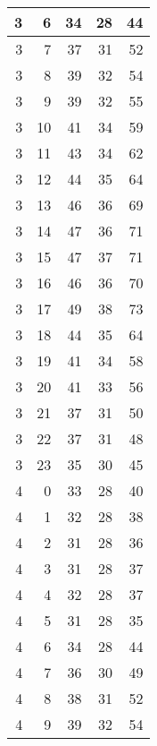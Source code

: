 \begin{longtable}{|r|r|r|r|r|}
    \hline
    3     & 6     & 34    & 28    & 44 \\
    \hline
    3     & 7     & 37    & 31    & 52 \\
    \hline
    3     & 8     & 39    & 32    & 54 \\
    \hline
    3     & 9     & 39    & 32    & 55 \\
    \hline
    3     & 10    & 41    & 34    & 59 \\
    \hline
    3     & 11    & 43    & 34    & 62 \\
    \hline
    3     & 12    & 44    & 35    & 64 \\
    \hline
    3     & 13    & 46    & 36    & 69 \\
    \hline
    3     & 14    & 47    & 36    & 71 \\
    \hline
    3     & 15    & 47    & 37    & 71 \\
    \hline
    3     & 16    & 46    & 36    & 70 \\
    \hline
    3     & 17    & 49    & 38    & 73 \\
    \hline
    3     & 18    & 44    & 35    & 64 \\
    \hline
    3     & 19    & 41    & 34    & 58 \\
    \hline
    3     & 20    & 41    & 33    & 56 \\
    \hline
    3     & 21    & 37    & 31    & 50 \\
    \hline
    3     & 22    & 37    & 31    & 48 \\
    \hline
    3     & 23    & 35    & 30    & 45 \\
    \hline
    4     & 0     & 33    & 28    & 40 \\
    \hline
    4     & 1     & 32    & 28    & 38 \\
    \hline
    4     & 2     & 31    & 28    & 36 \\
    \hline
    4     & 3     & 31    & 28    & 37 \\
    \hline
    4     & 4     & 32    & 28    & 37 \\
    \hline
    4     & 5     & 31    & 28    & 35 \\
    \hline
    4     & 6     & 34    & 28    & 44 \\
    \hline
    4     & 7     & 36    & 30    & 49 \\
    \hline
    4     & 8     & 38    & 31    & 52 \\
    \hline
    4     & 9     & 39    & 32    & 54 \\

\end{longtable}

